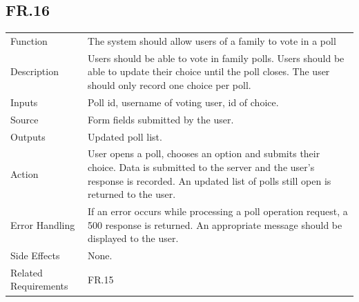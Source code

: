\documentclass[12pt]{article}
\begin{document}
    \subsection*{FR.16}
    \begin{center}
        \begin{tabular}{| p{10em} p{26em} |}
        \hline
         Function & The system should allow users of a family to vote in a poll\\
         Description & Users should be able to vote in family polls. Users should be able to update their choice until the poll closes. The user should only record one choice per poll.\\
         Inputs & Poll id, username of voting user, id of choice.\\
         Source & Form fields submitted by the user.\\
         Outputs & Updated poll list.\\
         Action & User opens a poll, chooses an option and submits their choice. Data is submitted to the server and the user's response is recorded. An updated list of polls still open is returned to the user.\\
         Error Handling & If an error occurs while processing a poll operation request, a 500 response is returned. An appropriate message should be displayed to the user.\\
         Side Effects & None.\\
         Related Requirements & FR.15\\
         \hline
        \end{tabular}
    \end{center}
\end{document}
